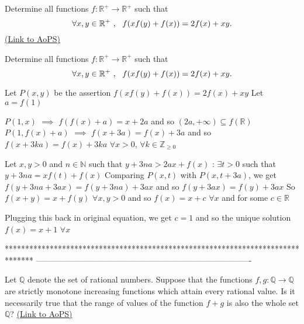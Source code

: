 \begin{problem}
	Determine all functions $f : \mathbb{R}^+ \to \mathbb{R}^+$ such that \[ \forall x,y \in \Bbb{R}^+ \ , \ \  f(xf(y)+f(x))=2f(x)+xy.\]
	\flushright \href{https://artofproblemsolving.com/community/c6h611705}{(Link to AoPS)}
\end{problem}



\begin{solution}
	\begin{tcolorbox}Determine all functions $f : \mathbb{R}^+ \to \mathbb{R}^+$ such that \[ \forall x,y \in \Bbb{R}^+ \ , \ \  f(xf(y)+f(x))=2f(x)+xy.\]\end{tcolorbox}
Let $P(x,y)$ be the assertion $f(xf(y)+f(x))=2f(x)+xy$
Let $a=f(1)$

$P(1,x)$ $\implies$ $f(f(x)+a)=x+2a$ and so $(2a,+\infty)\subseteq f(\mathbb R)$
$P(1,f(x)+a)$ $\implies$ $f(x+3a)=f(x)+3a$ and so $f(x+3ka)=f(x)+3ka$ $\forall x>0$, $\forall k\in\mathbb Z_{\ge 0}$

Let $x,y>0$ and $n\in\mathbb N$ such that $y+3na>2ax+f(x)$ : $\exists t>0$ such that $y+3na=xf(t)+f(x)$
Comparing $P(x,t)$ with $P(x,t+3a)$, we get $f(y+3na+3ax)=f(y+3na)+3ax$ and so $f(y+3ax)=f(y)+3ax$
So $f(x+y)=x+f(y)$ $\forall x,y>0$ and so $f(x)=x+c$  $\forall x$ and for some $c\in\mathbb R$

Plugging this back in original equation, we get $c=1$ and so the unique solution $\boxed{f(x)=x+1}$ $\forall x$
\end{solution}
*******************************************************************************
-------------------------------------------------------------------------------

\begin{problem}
	Let $\mathbb Q$ denote the set of rational numbers. Suppose that the functions $f, g: \mathbb Q\to \mathbb Q$ are strictly monotone increasing functions which attain every rational value. Is it necessarily true that the range of values of the function $f+g$ is also the whole set $\mathbb Q$?
	\flushright \href{https://artofproblemsolving.com/community/c6h611829}{(Link to AoPS)}
\end{problem}




